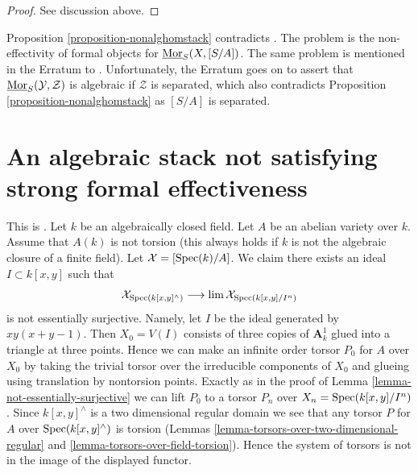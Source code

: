 \begin{proof}
See discussion above.
\end{proof}

\begin{remark}
\label{remark-contradict-aoki}
Proposition \ref{proposition-nonalghomstack} contradicts
\cite[Theorem 1.1]{AokiHomStacks}. The problem is the non-effectivity
of formal objects for $\underline{\mathop{\mathrm{Mor}}\nolimits}_S(X, [S/A])$. The same problem
is mentioned in the Erratum \cite{AokiHomStacksErr} to
\cite{AokiHomStacks}. Unfortunately, the Erratum goes on
to assert that $\underline{\mathop{\mathrm{Mor}}\nolimits}_S(\mathcal{Y}, \mathcal{Z})$
is algebraic if $\mathcal{Z}$ is separated, which also contradicts
Proposition \ref{proposition-nonalghomstack} as $[S/A]$ is separated.
\end{remark}








\section{An algebraic stack not satisfying strong formal effectiveness}
\label{section-non-formal-effectiveness}

\noindent
This is \cite[Example 4.12]{Bhatt-Algebraize}.
Let $k$ be an algebraically closed field.
Let $A$ be an abelian variety over $k$.
Assume that $A(k)$ is not torsion (this always holds if $k$
is not the algebraic closure of a finite field).
Let $\mathcal{X} = [\mathop{\mathrm{Spec}}(k)/A]$.
We claim there exists an ideal $I \subset k[x, y]$
such that
$$
\mathcal{X}_{\mathop{\mathrm{Spec}}(k[x, y]^\wedge)}
\longrightarrow
\mathop{\mathrm{lim}}\nolimits \mathcal{X}_{\mathop{\mathrm{Spec}}(k[x, y]/I^n)}
$$
is not essentially surjective. Namely, let $I$
be the ideal generated by $xy(x + y - 1)$.
Then $X_0 = V(I)$ consists of three copies of $\mathbf{A}^1_k$
glued into a triangle at three points. Hence we can make an infinite order
torsor $P_0$ for $A$ over $X_0$ by taking the trivial torsor
over the irreducible components of $X_0$ and glueing
using translation by nontorsion points.
Exactly as in the proof of Lemma \ref{lemma-not-essentially-surjective}
we can lift $P_0$ to a torsor $P_n$ over $X_n = \mathop{\mathrm{Spec}}(k[x, y]/I^n)$.
Since $k[x, y]^\wedge$ is a two dimensional regular domain
we see that any torsor $P$ for $A$ over $\mathop{\mathrm{Spec}}(k[x, y]^\wedge)$
is torsion (Lemmas \ref{lemma-torsors-over-two-dimensional-regular}
and \ref{lemma-torsors-over-field-torsion}). Hence the system of
torsors is not in the image of the displayed functor.

